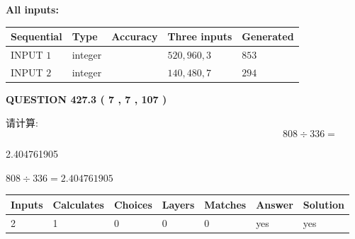 \documentclass{ctexart}
\begin{document}
   
\noindent\vspace{0.1in}\hspace{-0.08in} {\textbf{\Large{All inputs: }}}
   
   
  
  
\noindent\begin{tabular}{|l|l|l|l|l|}
\hline
 Sequential & Type & Accuracy & Three inputs & Generated \\ 
\hline
 
 
  INPUT $  1 $ & integer &  & $
 520
 , 
 960
 , 
 3
 $ & $ 853 $ 
 \\  \hline  
 
 
  INPUT $  2 $ & integer &  & $
 140
 , 
 480
 , 
 7
 $ & $ 294 $ 
 \\  \hline  
 \end{tabular}
   
   
  
\vspace{0.2in}
  
{\textbf{\Large{QUESTION
427.3 
 ( 7 , 7 , 107 )
}}}
  
  
 
请计算:
\begin{equation}
808  \div    %
336 = \nonumber
\end{equation}
 
 
 
\noindent{}
 
 

2.404761905
 
 
\noindent{}
 
 

 
 
 
\noindent{}
 
 

$ %
808 \div  %
336=   %
2.404761905$
 
 
\noindent{}
 
 

 
   
   
   
   
\noindent\begin{tabular}{|l|l|l|l|l|l|l|}
 \hline
Inputs & Calculates & Choices & Layers & Matches & Answer & Solution \\ \hline
 2  & 
 1  & 
 0
  & 
 0  & 
 0  & 
  yes & 
  yes 
  \\ \hline
 \end{tabular}
   
\end{document}
